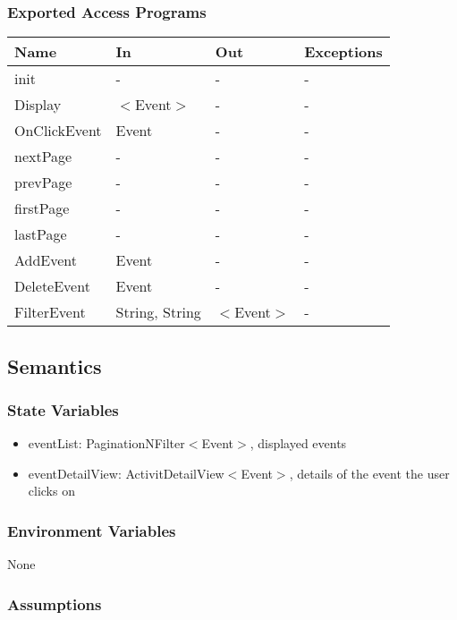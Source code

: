 \documentclass[12pt, titlepage]{article}
\begin{document}
\subsubsection{Exported Access Programs}
\begin{center}
\begin{tabular}{p{4cm} p{2cm} p{4cm} p{4cm}}
\hline
\textbf{Name} & \textbf{In} & \textbf{Out} & \textbf{Exceptions} \\
\hline
init & - & - & -\\
Display & $<$Event$>$ & - & - \\
OnClickEvent & Event & - & -\\ 
nextPage & - & - &  -\\
prevPage & - & - &  -\\
firstPage & - & - &  -\\
lastPage & - & - &  -\\
AddEvent & Event & - & - \\
DeleteEvent & Event & - & - \\
FilterEvent & String, String & $<$Event$>$ & - \\
\hline
\end{tabular}
\end{center}

\subsection{Semantics}

\subsubsection{State Variables}

\begin{itemize}
\item eventList: PaginationNFilter$<$Event$>$, displayed events
\item eventDetailView: ActivitDetailView$<$Event$>$, details of the event the user clicks on
\end{itemize}

\subsubsection{Environment Variables}

None

\subsubsection{Assumptions}
\end{document}
